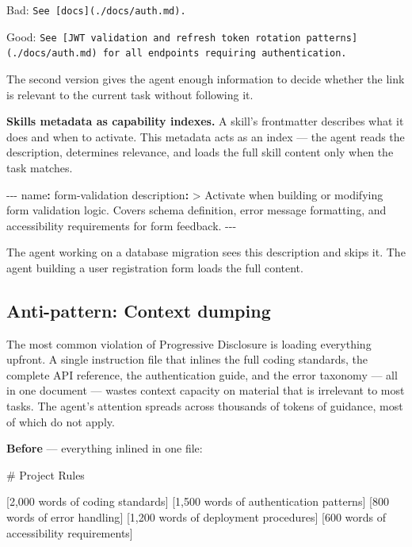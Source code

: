 \documentclass[
  a4paper,
  DIV=11,
  numbers=noendperiod]{scrreprt}
\newenvironment{Shaded}{\begin{snugshade}}{\end{snugshade}}
\newcommand{\AttributeTok}[1]{\textcolor[rgb]{0.40,0.45,0.13}{#1}}
\newcommand{\CharTok}[1]{\textcolor[rgb]{0.13,0.47,0.30}{#1}}
\newcommand{\CommentTok}[1]{\textcolor[rgb]{0.37,0.37,0.37}{#1}}
\newcommand{\FunctionTok}[1]{\textcolor[rgb]{0.28,0.35,0.67}{#1}}
\newcommand{\KeywordTok}[1]{\textcolor[rgb]{0.00,0.23,0.31}{\textbf{#1}}}
\newcommand{\NormalTok}[1]{\textcolor[rgb]{0.00,0.23,0.31}{#1}}
\newcommand{\OtherTok}[1]{\textcolor[rgb]{0.00,0.23,0.31}{#1}}
\newcommand{\PreprocessorTok}[1]{\textcolor[rgb]{0.68,0.00,0.00}{#1}}
\begin{document}
Bad: \texttt{See\ {[}docs{]}(./docs/auth.md).}

Good:
\texttt{See\ {[}JWT\ validation\ and\ refresh\ token\ rotation\ patterns{]}(./docs/auth.md)\ for\ all\ endpoints\ requiring\ authentication.}

The second version gives the agent enough information to decide whether
the link is relevant to the current task without following it.

\textbf{Skills metadata as capability indexes.} A skill's frontmatter
describes what it does and when to activate. This metadata acts as an
index --- the agent reads the description, determines relevance, and
loads the full skill content only when the task matches.

\begin{Shaded}
\begin{Highlighting}[]
\PreprocessorTok{{-}{-}{-}}
\FunctionTok{name}\KeywordTok{:}\AttributeTok{ form{-}validation}
\FunctionTok{description}\KeywordTok{: }\CharTok{\textgreater{}}
\NormalTok{  Activate when building or modifying form validation logic.}
\NormalTok{  Covers schema definition, error message formatting, and}
\NormalTok{  accessibility requirements for form feedback.}
\PreprocessorTok{{-}{-}{-}}
\end{Highlighting}
\end{Shaded}

The agent working on a database migration sees this description and
skips it. The agent building a user registration form loads the full
content.

\subsection{Anti-pattern: Context
dumping}\label{anti-pattern-context-dumping}

The most common violation of Progressive Disclosure is loading
everything upfront. A single instruction file that inlines the full
coding standards, the complete API reference, the authentication guide,
and the error taxonomy --- all in one document --- wastes context
capacity on material that is irrelevant to most tasks. The agent's
attention spreads across thousands of tokens of guidance, most of which
do not apply.

\textbf{Before} --- everything inlined in one file:

\begin{Shaded}
\begin{Highlighting}[]
\FunctionTok{\# Project Rules}

\CommentTok{[}\OtherTok{2,000 words of coding standards}\CommentTok{]}
\CommentTok{[}\OtherTok{1,500 words of authentication patterns}\CommentTok{]}
\CommentTok{[}\OtherTok{800 words of error handling}\CommentTok{]}
\CommentTok{[}\OtherTok{1,200 words of deployment procedures}\CommentTok{]}
\CommentTok{[}\OtherTok{600 words of accessibility requirements}\CommentTok{]}
\end{Highlighting}
\end{Shaded}
\end{document}
